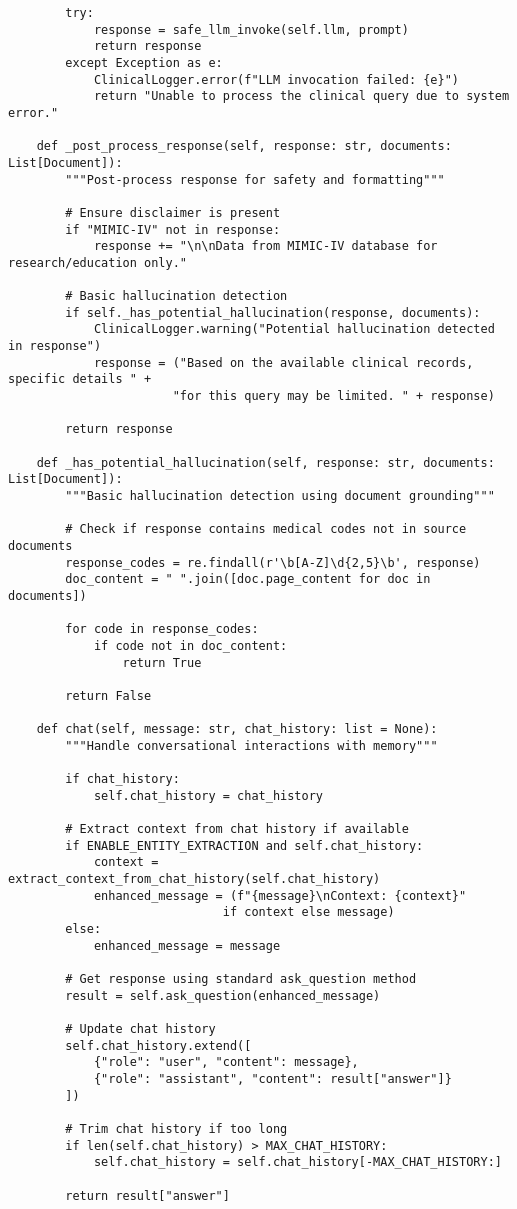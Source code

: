 \begin{verbatim}
        try:
            response = safe_llm_invoke(self.llm, prompt)
            return response
        except Exception as e:
            ClinicalLogger.error(f"LLM invocation failed: {e}")
            return "Unable to process the clinical query due to system error."
    
    def _post_process_response(self, response: str, documents: List[Document]):
        """Post-process response for safety and formatting"""
        
        # Ensure disclaimer is present
        if "MIMIC-IV" not in response:
            response += "\n\nData from MIMIC-IV database for research/education only."
        
        # Basic hallucination detection
        if self._has_potential_hallucination(response, documents):
            ClinicalLogger.warning("Potential hallucination detected in response")
            response = ("Based on the available clinical records, specific details " +
                       "for this query may be limited. " + response)
        
        return response
    
    def _has_potential_hallucination(self, response: str, documents: List[Document]):
        """Basic hallucination detection using document grounding"""
        
        # Check if response contains medical codes not in source documents
        response_codes = re.findall(r'\b[A-Z]\d{2,5}\b', response)
        doc_content = " ".join([doc.page_content for doc in documents])
        
        for code in response_codes:
            if code not in doc_content:
                return True
        
        return False

    def chat(self, message: str, chat_history: list = None):
        """Handle conversational interactions with memory"""
        
        if chat_history:
            self.chat_history = chat_history
        
        # Extract context from chat history if available
        if ENABLE_ENTITY_EXTRACTION and self.chat_history:
            context = extract_context_from_chat_history(self.chat_history)
            enhanced_message = (f"{message}\nContext: {context}" 
                              if context else message)
        else:
            enhanced_message = message
        
        # Get response using standard ask_question method
        result = self.ask_question(enhanced_message)
        
        # Update chat history
        self.chat_history.extend([
            {"role": "user", "content": message},
            {"role": "assistant", "content": result["answer"]}
        ])
        
        # Trim chat history if too long
        if len(self.chat_history) > MAX_CHAT_HISTORY:
            self.chat_history = self.chat_history[-MAX_CHAT_HISTORY:]
        
        return result["answer"]
\end{verbatim}

